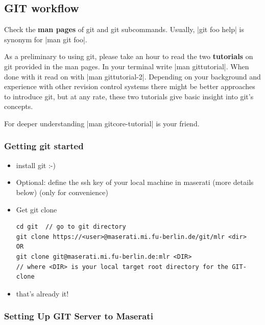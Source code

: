 \subsection{GIT workflow}\label{secGit}

Check the \textbf{man pages} of git and git subcommands. Usually,
|git foo help| is synonym for |man git foo|.

As a preliminary to using git, please take an hour to read the two
\textbf{tutorials} on git provided in the man pages. In your terminal
write |man gittutorial|. When done with it read on with
|man gittutorial-2|.
Depending on your background and experience with other revision control
systems there might be better approaches to introduce git, but at any
rate, these two tutorials give basic insight into git's concepts.

For deeper understanding |man gitcore-tutorial| is your friend.


\subsubsection{Getting git started}

\begin{itemize}

\item install git :-)

\item Optional: define the ssh key of your local machine in maserati
(more details below) (only for convenience)

\item Get git clone
\begin{code}
\begin{verbatim}
cd git  // go to git directory
git clone https://<user>@maserati.mi.fu-berlin.de/git/mlr <dir>
OR
git clone git@maserati.mi.fu-berlin.de:mlr <DIR>
// where <DIR> is your local target root directory for the GIT-clone
\end{verbatim}
\end{code}

\item that's already it!

\end{itemize}



\subsubsection{Setting Up GIT Server to Maserati}

